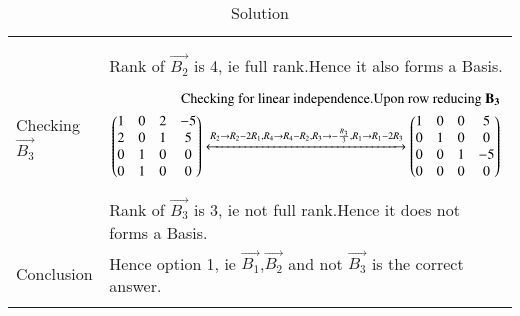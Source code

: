\begin{longtable}{|p{5cm}|p{13cm}|}
{\begin{align}
\end{align}}\\
& Rank of $\vec{B_2}$ is 4, ie full rank.Hence it also forms a Basis.\\
\hline
 Checking $\vec{B_3}$&
\parbox{12cm}{\begin{align}\text{Checking for linear independence.}
  \text{Upon row reducing }\mathbf{B_3}\\
    \begin{pmatrix}1&0&2&-5\\2&0&1&5\\0&1&0&0\\0&1&0&0\end{pmatrix}\xleftrightarrow[]{R_2\rightarrow R_2-2R_1, R_4\rightarrow R_4-R_2,R_3\rightarrow -\frac{R_3}{3},R_1\rightarrow R_1-2R_3}\begin{pmatrix}1&0&0&5\\0&1&0&0\\0&0&1&-5\\0&0&0&0\end{pmatrix}
\end{align}}\\
& Rank of $\vec{B_3}$ is 3, ie not full rank.Hence it does not forms a Basis.\\
\hline
 Conclusion&
Hence option 1, ie  $\vec{B_1}$,$\vec{B_2}$ and not  $\vec{B_3}$ is the correct answer.\\
\hline
\caption{Solution}
\label{eq:solutions/106/dec/27/Table1}
\end{longtable}
\twocolumn

